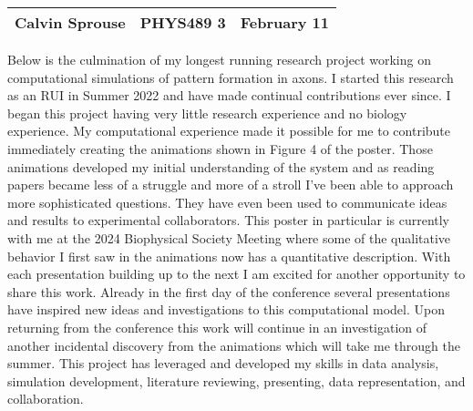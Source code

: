 \documentclass[a4paper, 12pt]{config/homework}
\begin{document}
\noindent
\begin{tabularx}{\textwidth}{>{\centering\arraybackslash}X>{\centering\arraybackslash}X>{\centering\arraybackslash}X}
Calvin Sprouse & PHYS489 3 & 2024 February 11\\
\midrule
\end{tabularx}



Below is the culmination of my longest running research project working on computational simulations of pattern formation in axons. I started this research as an RUI in Summer 2022 and have made continual contributions ever since. I began this project having very little research experience and no biology experience. My computational experience made it possible for me to contribute immediately creating the animations shown in Figure 4 of the poster. Those animations developed my initial understanding of the system and as reading papers became less of a struggle and more of a stroll I've been able to approach more sophisticated questions. They have even been used to communicate ideas and results to experimental collaborators. This poster in particular is currently with me at the 2024 Biophysical Society Meeting where some of the qualitative behavior I first saw in the animations now has a quantitative description. With each presentation building up to the next I am excited for another opportunity to share this work. Already in the first day of the conference several presentations have inspired new ideas and investigations to this computational model. Upon returning from the conference this work will continue in an investigation of another incidental discovery from the animations which will take me through the summer. This project has leveraged and developed my skills in data analysis, simulation development, literature reviewing, presenting, data representation, and collaboration.


\end{document}

